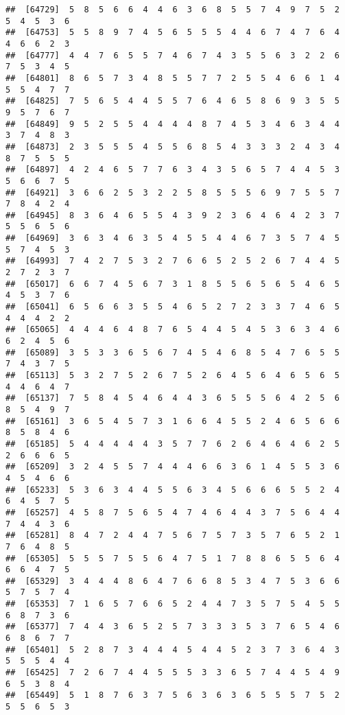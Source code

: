 \documentclass[
]{book}
\begin{document}
\begin{verbatim}
##  [64729]  5  8  5  6  6  4  4  6  3  6  8  5  5  7  4  9  7  5  2  5  4  5  3  6
##  [64753]  5  5  8  9  7  4  5  6  5  5  5  4  4  6  7  4  7  6  4  4  6  6  2  3
##  [64777]  4  4  7  6  5  5  7  4  6  7  4  3  5  5  6  3  2  2  6  7  5  3  4  5
##  [64801]  8  6  5  7  3  4  8  5  5  7  7  2  5  5  4  6  6  1  4  5  5  4  7  7
##  [64825]  7  5  6  5  4  4  5  5  7  6  4  6  5  8  6  9  3  5  5  9  5  7  6  7
##  [64849]  9  5  2  5  5  4  4  4  4  8  7  4  5  3  4  6  3  4  4  3  7  4  8  3
##  [64873]  2  3  5  5  5  4  5  5  6  8  5  4  3  3  3  2  4  3  4  8  7  5  5  5
##  [64897]  4  2  4  6  5  7  7  6  3  4  3  5  6  5  7  4  4  5  3  5  6  6  7  5
##  [64921]  3  6  6  2  5  3  2  2  5  8  5  5  5  6  9  7  5  5  7  7  8  4  2  4
##  [64945]  8  3  6  4  6  5  5  4  3  9  2  3  6  4  6  4  2  3  7  5  5  6  5  6
##  [64969]  3  6  3  4  6  3  5  4  5  5  4  4  6  7  3  5  7  4  5  5  7  4  5  3
##  [64993]  7  4  2  7  5  3  2  7  6  6  5  2  5  2  6  7  4  4  5  2  7  2  3  7
##  [65017]  6  6  7  4  5  6  7  3  1  8  5  5  6  5  6  5  4  6  5  4  5  3  7  6
##  [65041]  6  5  6  6  3  5  5  4  6  5  2  7  2  3  3  7  4  6  5  4  4  4  2  2
##  [65065]  4  4  4  6  4  8  7  6  5  4  4  5  4  5  3  6  3  4  6  6  2  4  5  6
##  [65089]  3  5  3  3  6  5  6  7  4  5  4  6  8  5  4  7  6  5  5  7  4  3  7  5
##  [65113]  5  3  2  7  5  2  6  7  5  2  6  4  5  6  4  6  5  6  5  4  4  6  4  7
##  [65137]  7  5  8  4  5  4  6  4  4  3  6  5  5  5  6  4  2  5  6  8  5  4  9  7
##  [65161]  3  6  5  4  5  7  3  1  6  6  4  5  5  2  4  6  5  6  6  8  5  8  4  6
##  [65185]  5  4  4  4  4  4  3  5  7  7  6  2  6  4  6  4  6  2  5  2  6  6  6  5
##  [65209]  3  2  4  5  5  7  4  4  4  6  6  3  6  1  4  5  5  3  6  4  5  4  6  6
##  [65233]  5  3  6  3  4  4  5  5  6  3  4  5  6  6  6  5  5  2  4  6  4  5  7  5
##  [65257]  4  5  8  7  5  6  5  4  7  4  6  4  4  3  7  5  6  4  4  7  4  4  3  6
##  [65281]  8  4  7  2  4  4  7  5  6  7  5  7  3  5  7  6  5  2  1  7  6  4  8  5
##  [65305]  5  5  5  7  5  5  6  4  7  5  1  7  8  8  6  5  5  6  4  6  6  4  7  5
##  [65329]  3  4  4  4  8  6  4  7  6  6  8  5  3  4  7  5  3  6  6  5  7  5  7  4
##  [65353]  7  1  6  5  7  6  6  5  2  4  4  7  3  5  7  5  4  5  5  6  8  7  3  6
##  [65377]  7  4  4  3  6  5  2  5  7  3  3  3  5  3  7  6  5  4  6  6  8  6  7  7
##  [65401]  5  2  8  7  3  4  4  4  5  4  4  5  2  3  7  3  6  4  3  5  5  5  4  4
##  [65425]  7  2  6  7  4  4  5  5  5  3  3  6  5  7  4  4  5  4  9  6  5  3  8  4
##  [65449]  5  1  8  7  6  3  7  5  6  3  6  3  6  5  5  5  7  5  2  5  5  6  5  3

\end{verbatim}
\end{document}
